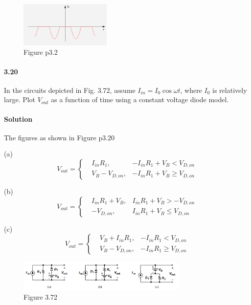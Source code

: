 \documentclass[hyperref, UTF8]{ctexart}
\begin{document}
\begin{figure}[!htb]
    \centering
    \includegraphics[width=0.400\textwidth]{p3-2.png}
    \caption*{Figure p3.2}
\end{figure}

\paragraph{3.20}
In the circuits depicted in Fig. 3.72, assume $I_{in}=I_0 \cos \omega t$, where $I_0$ is
relatively large. Plot $V_{out}$ as a function of time using a constant voltage diode model.

\paragraph{Solution} The figures as shown in Figure p3.20

(a)
$$
V_{out} = \left\{ \begin{aligned}
    & I_{in}R_1, & -I_{in}R_1+V_B < V_{D,on} \\
    & V_B - V_{D,on}, & -I_{in}R_1+V_B \ge V_{D,on} 
\end{aligned} \right.
$$

(b)
$$
V_{out} = \left\{ \begin{aligned}
    & I_{in}R_1 + V_B, & I_{in}R_1+V_B > -V_{D,on} \\
    & - V_{D,on}, & I_{in}R_1+V_B \le V_{D,on} 
\end{aligned} \right.
$$

(c)
$$
V_{out} = \left\{ \begin{aligned}
    & V_B + I_{in}R_1, & -I_{in}R_1 < V_{D,on} \\
    & V_B - V_{D,on}, & -I_{in}R_1 \ge V_{D,on} 
\end{aligned} \right.
$$

\begin{figure}[!htb]
    \centering
    \includegraphics[width=0.748\textwidth]{f3-72.png}
    \caption*{Figure 3.72}
\end{figure}    
\end{document}
